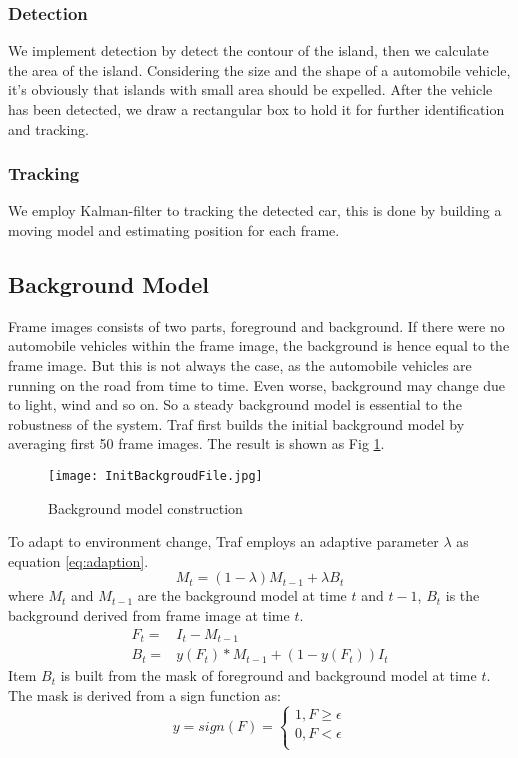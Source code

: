 \documentclass[conference]{IEEEtran}
\begin{document}
	\subsubsection{Detection}
	We implement detection by detect the contour of the island, then we calculate the area of the island. Considering the size and the shape of a automobile vehicle, it's obviously that islands with small area should be expelled. After the vehicle has been detected, we draw a rectangular box to hold it for further identification and tracking.
	
	
	\subsubsection{Tracking}
	We employ Kalman-filter to tracking the detected car, this is done by building a moving model and estimating position for each frame.	%
	\subsection{Background Model}
	Frame images consists of two parts, foreground and background. If there were no automobile vehicles within the frame image, the background is hence equal to the frame image. But this is not always the case, as the automobile vehicles are running on the road from time to time. Even worse, background may change due to light, wind and so on. So a steady background model is essential to the robustness of the system.
	Traf first builds the initial background model by averaging first 50 frame images. The result is shown as Fig \ref{fig:backgroundModel}.
	\begin{figure}[!h]
	\centering
	\texttt{[image: InitBackgroudFile.jpg]} 
	\caption{Background model construction}
	\label{fig:backgroundModel}
	\end{figure}
	 	
	To adapt to environment change, Traf employs an adaptive parameter $\lambda$ as equation \ref{eq:adaption}.
	\begin{equation}
	M_{t} = (1-\lambda)M_{t-1} + \lambda B_{t}
	\label{eq:adaption}
	\end{equation}
	where $M_t$ and $M_{t-1}$ are the background model at time $t$ and $t-1$, $B_{t}$ is the background derived from frame image at time $t$.
	\begin{eqnarray}	
	F_{t}=&I_{t} - M_{t-1}	\\
	B_{t}=&y(F_{t})*M_{t-1}+(1-y(F_{t}))I_{t}
	\end{eqnarray}
Item $B_{t}$ is built from the mask of foreground and background model at time $t$. The mask is derived from a sign function as:
	\begin{equation}
	  y=sign(F)=\left\{
	   \begin{aligned}
	   	1, F \geq \epsilon \\
	   	0, F < \epsilon \\
	   \end{aligned}
	   \right.
	\end{equation}			
	
\end{document}
